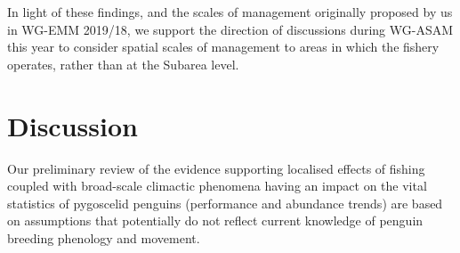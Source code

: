 \documentclass[]{elsarticle} %
\begin{document}
In light of these findings, and the scales of management originally
proposed by us in WG-EMM 2019/18, we support the direction of
discussions during WG-ASAM this year to consider spatial scales of
management to areas in which the fishery operates, rather than at the
Subarea level.

\begin{table}[ht]
\centering
{}
\caption{Summary Table showing what was bullshit, and where to find the analysis and data in our paper.}
\end{table}

\section{Discussion}\label{discussion}

Our preliminary review of the evidence supporting localised effects of
fishing coupled with broad-scale climactic phenomena having an impact on
the vital statistics of pygoscelid penguins (performance and abundance
trends) are based on assumptions that potentially do not reflect current
knowledge of penguin breeding phenology and movement.
\end{document}

